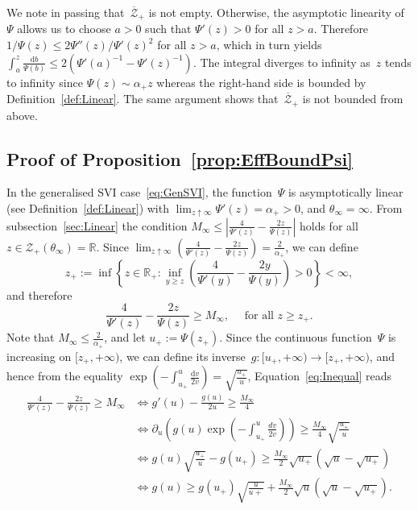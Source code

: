 \documentclass{amsart}[11pt]
\numberwithin{equation}{section}
\theoremstyle{definition}
\newcommand{\D}{\mathrm{d}}
\newcommand{\Zz}{\mathcal{Z}}
\begin{document}
We note in passing that~$\overline{\Zz}_+$ is not empty.
Otherwise, the asymptotic linearity of $\Psi$ allows us to choose $a > 0$ such that $\Psi'(z) > 0$ for all $z>a$.
Therefore $1/\Psi(z)\leq 2\Psi''(z)/\Psi'(z)^2$  for all $z>a$,
which in turn yields $\int_a^z \frac{\D b}{\Psi(b)} \leq 2(\Psi'(a)^{-1}-\Psi'(z)^{-1})$.
The integral diverges to infinity as~$z$ tends to infinity since $\Psi(z) \sim \alpha_+ z$
whereas the right-hand side is bounded by Definition~\ref{def:Linear}. 
The same argument shows that~$\overline{\Zz}_+$ is not bounded from above.



\subsection{Proof of Proposition~\ref{prop:EffBoundPsi}}\label{sec:prop:EffBoundPsi}
In the generalised SVI case~\eqref{eq:GenSVI}, the function~$\Psi$ is asymptotically linear 
(see Definition~\ref{def:Linear}) with 
$\lim_{z\uparrow \infty}\Psi'(z)=\alpha_+>0$, and $\theta_\infty = \infty$.
From subsection~\ref{sec:Linear} the condition $M_{\infty} \leq \left| \frac{4}{\Psi'(z)} - \frac{2 z}{\Psi(z)} \right|$
holds for all $z \in \Zz_+(\theta_\infty) = \mathbb{R}$.
Since $\lim_{z\uparrow\infty}\left(\frac{4}{\Psi'(z)} - \frac{2 z}{\Psi(z)}\right)=\frac{2}{\alpha_+}$, we can define
$$ z_+:= \inf \left\{z \in \mathbb{R}_+: \inf_{y\geq z}\left(\frac{4}{\Psi'(y)} - \frac{2 y}{\Psi(y)}\right) > 0 \right\}<\infty,$$
and therefore
\begin{equation}\label{eq:Inequal}
\frac{4}{\Psi'(z)} - \frac{2 z}{\Psi(z)} \geq M_{\infty},
\quad\text{ for all }z \geq z_+.
\end{equation}
Note that $M_\infty \leq \frac{2}{\alpha_+}$, and let $u_+ := \Psi(z_+)$.
Since the continuous function~$\Psi$ is increasing on $[z_+,+\infty)$, 
we can define its inverse~$g:[u_+,+\infty) \to [z_+,+\infty)$,
and hence from the equality $\exp\left(-\int_{u_+}^{u} \frac{\D v}{2 v}\right) = \sqrt{\frac{u_+}{u}}$, 
Equation~\eqref{eq:Inequal} reads
\begin{align*}
\frac{4}{\Psi'(z)} - \frac{2 z}{\Psi(z)} \geq M_{\infty}
 & \iff g'(u)-\frac{g(u)}{2 u} \geq \frac{M_{\infty}}{4}\\
 & \iff \partial_u\left(g(u) \exp\left(-\int_{u_+}^{u} \frac{dv}{2 v}\right)\right) \geq \frac{M_{\infty}}{4} \sqrt{\frac{u_+}{u}}\\
 & \iff g(u) \sqrt{\frac{u_+}{u}} - g(u_+) \geq \frac{M_{\infty}}{2} \sqrt{u_+} \left(\sqrt{u} - \sqrt{u_+}\right)\\
 & \iff g(u) \geq g(u_+) \sqrt{\frac{u}{u+}} + \frac{M_{\infty}}{2} \sqrt{u} \left(\sqrt{u} - \sqrt{u_+}\right).
\end{align*}
\end{document}
